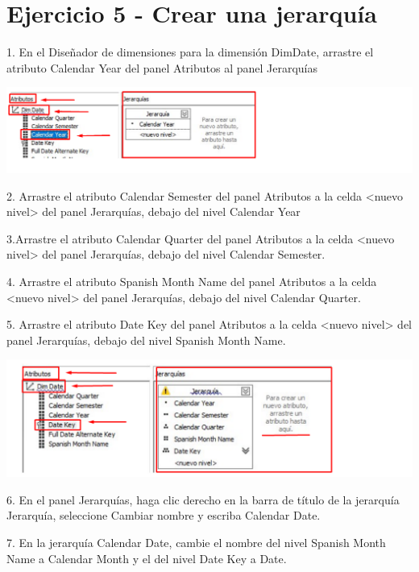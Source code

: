 \section{Ejercicio 5 - Crear una jerarquía}  

1. En el Diseñador de dimensiones para la dimensión DimDate, arrastre el atributo Calendar Year del panel
Atributos al panel Jerarquías

	\begin{center}
	\includegraphics[width=\columnwidth]{images/task5/img1}
	\end{center}	

2. Arrastre el atributo Calendar Semester del panel Atributos a la celda <nuevo nivel> del panel Jerarquías, debajo
del nivel Calendar Year

3.Arrastre el atributo Calendar Quarter del panel Atributos a la celda <nuevo nivel> del panel Jerarquías, debajo
del nivel Calendar Semester.

4. Arrastre el atributo Spanish Month Name del panel Atributos a la celda <nuevo nivel> del panel Jerarquías, debajo del nivel Calendar Quarter.

5. Arrastre el atributo Date Key del panel Atributos a la celda <nuevo nivel> del panel Jerarquías, debajo del nivel
Spanish Month Name.

	\begin{center}
	\includegraphics[width=\columnwidth]{images/task5/img2}
	\end{center}	

6. En el panel Jerarquías, haga clic derecho en la barra de título de la jerarquía Jerarquía, seleccione Cambiar nombre
y escriba Calendar Date.

7. En la jerarquía Calendar Date, cambie el nombre del nivel Spanish Month Name a Calendar Month y el del nivel
Date Key a Date.

